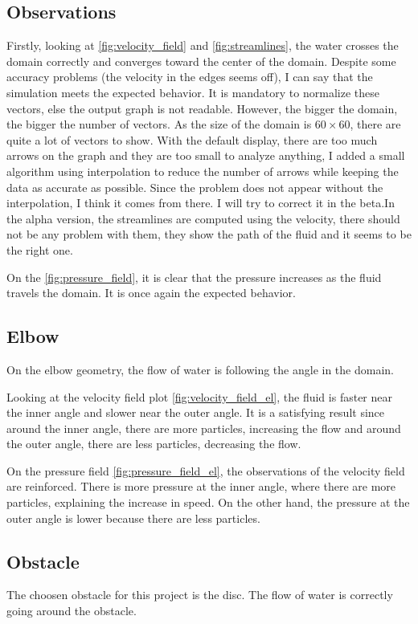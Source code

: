 \subsection{Observations}
Firstly, looking at \autoref{fig:velocity_field} and \autoref{fig:streamlines},
the water crosses the domain correctly and converges toward the center of the
domain. Despite some accuracy problems (the velocity in the edges seems off),
I can say that the simulation meets the expected behavior. It is mandatory to
normalize these vectors, else the output graph is not readable. However, the
bigger the domain, the bigger the number of vectors. As the size of the domain 
is $\num{60} \times \num{60}$, there are quite a lot of vectors to show. With
the default display, there are too much arrows on the graph and they are too
small to analyze anything, I added a small algorithm using interpolation to
reduce the number of arrows while keeping the data as accurate as possible.
Since the problem does not appear without the interpolation, I think it comes
from there. I will try to correct it in the beta.In the alpha version, the
streamlines are computed using the velocity, there should not be any problem
with them, they show the path of the fluid and it seems to be the right one.

On the \autoref{fig:pressure_field}, it is clear that the pressure increases as
the fluid travels the domain. It is once again the expected behavior.

\subsection{Elbow}
On the elbow geometry, the flow of water is following the angle in the domain.

Looking at the velocity field plot \autoref{fig:velocity_field_el}, the fluid
is faster near the inner angle and slower near the outer angle. It is a
satisfying result since around the inner angle, there are more particles,
increasing the flow and around the outer angle, there are less particles,
decreasing the flow.

On the pressure field \autoref{fig:pressure_field_el}, the observations of the
velocity field are reinforced. There is more pressure at the inner angle, where
there are more particles, explaining the increase in speed. On the other hand,
the pressure at the outer angle is lower because there are less particles.

\subsection{Obstacle}
The choosen obstacle for this project is the disc. The flow of water is
correctly going around the obstacle.

